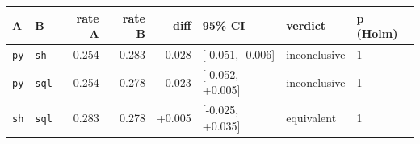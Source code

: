 \begin{tabular}{llrrrlll}
\toprule
A & B & rate A & rate B & diff & 95\% CI & verdict & p (Holm) \\
\midrule
\texttt{py} & \texttt{sh} & 0.254 & 0.283 & -0.028 & [-0.051, -0.006] & inconclusive & 1 \\
\texttt{py} & \texttt{sql} & 0.254 & 0.278 & -0.023 & [-0.052, +0.005] & inconclusive & 1 \\
\texttt{sh} & \texttt{sql} & 0.283 & 0.278 & +0.005 & [-0.025, +0.035] & equivalent & 1 \\
\bottomrule
\end{tabular}
